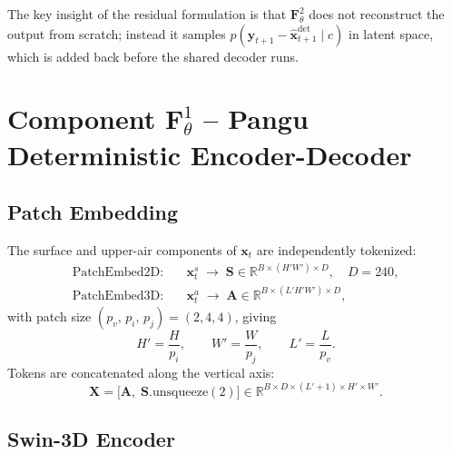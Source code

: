 \documentclass[11pt]{article}
\begin{document}
The key insight of the residual formulation is that $\mathbf{F}^2_\theta$ does
not reconstruct the output from scratch; instead it samples
$p(\mathbf{y}_{t+1} - \hat{\mathbf{x}}_{t+1}^{\mathrm{det}} \mid c)$
in latent space, which is added back before the shared decoder runs.

\section{Component $\mathbf{F}^1_\theta$ -- Pangu Deterministic Encoder-Decoder}
\label{sec:pangu}

\subsection{Patch Embedding}

The surface and upper-air components of $\mathbf{x}_t$ are independently
tokenized:
\begin{align}
  \text{PatchEmbed2D}:&\quad
    \mathbf{x}_t^s \;\longrightarrow\; \mathbf{S}
    \in \mathbb{R}^{B \times (H' W') \times D},
    \quad D = 240,\\
  \text{PatchEmbed3D}:&\quad
    \mathbf{x}_t^a \;\longrightarrow\; \mathbf{A}
    \in \mathbb{R}^{B \times (L' H' W') \times D},
\end{align}
with patch size $(p_v,\, p_i,\, p_j) = (2, 4, 4)$, giving
\begin{equation}
  H' = \frac{H}{p_i}, \qquad
  W' = \frac{W}{p_j}, \qquad
  L' = \frac{L}{p_v}.
\end{equation}
Tokens are concatenated along the vertical axis:
\begin{equation}
  \mathbf{X}
  = \bigl[\mathbf{A},\;\mathbf{S}.\mathrm{unsqueeze}(2)\bigr]
  \in \mathbb{R}^{B \times D \times (L'+1) \times H' \times W'}.
\end{equation}

\subsection{Swin-3D Encoder}
\end{document}

